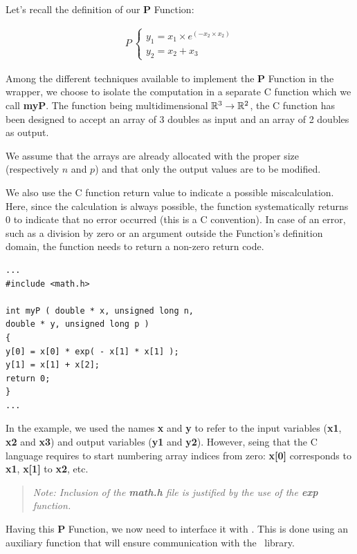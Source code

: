 Let's recall the definition of our {\bf P} Function:

\begin{align*}
P\:\left\{\begin{array}{l}
y_1 = x_1 \times e^{(- x_2 \times x_2)} \\
y_2 = x_2 + x_3
\end{array}
\right.
\end{align*}

Among the different techniques available to implement the {\bf P} Function in the wrapper, we choose to isolate the computation in a separate C function which we call {\bf myP}. The function being multidimensional ${\mathbb R}^{3} \to {\mathbb R}^{2}$, the C function has been designed to accept an array of 3 doubles as input and an array of 2 doubles as output.

We assume that the arrays are already allocated with the proper size (respectively $n$ and $p$) and that only the output values are to be modified.

We also use the C function return value to indicate a possible miscalculation. Here, since the calculation is always possible, the function systematically returns 0 to indicate that no error occurred (this is a C convention). In case of an error, such as a division by zero or an argument outside the Function's definition domain, the function needs to return a non-zero return code.

\lstset{language=C, basicstyle=\normalsize}
\begin{lstlisting}[frame=TBRL]
...
#include <math.h>

int myP ( double * x, unsigned long n,
double * y, unsigned long p )
{
y[0] = x[0] * exp( - x[1] * x[1] );
y[1] = x[1] + x[2];
return 0;
}
...
\end{lstlisting}

In the example, we used the names {\bf x} and {\bf y} to refer to the input variables ({\bf x1}, {\bf x2} and {\bf x3}) and output variables ({\bf y1} and {\bf y2}). However, seing that the C language requires to start numbering array indices from zero: {\bf x[0]} corresponds to {\bf x1}, {\bf x[1]} to {\bf x2}, etc.

\small
\begin{quote}
\textit{Note: Inclusion of the {\bf math.h} file is justified by the use of the {\bf exp} function.}
\end{quote}
\normalsize

Having this {\bf P} Function, we now need to interface it with \OT. This is done using an auxiliary function that will ensure communication with the \OT\ library.

